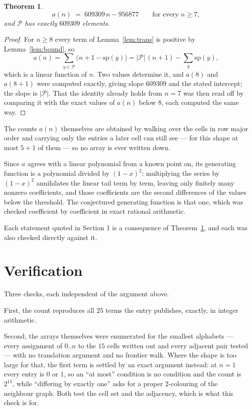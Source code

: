 \documentclass[11pt,a4paper]{article}
\theoremstyle{plain}
\newtheorem{theorem}{Theorem}
\theoremstyle{definition}
\begin{document}
\begin{theorem}\label{thm:line}
\[
a(n)\;=\;609309\,n-956877\qquad\text{for every }n\ge7,
\]
and $\mathcal P$ has exactly $609309$ elements.
\end{theorem}

\begin{proof}
For $n\ge8$ every term of Lemma~\ref{lem:trans} is positive by
Lemma~\ref{lem:bound}, so
\[
a(n)=\sum_{y\in\mathcal P}\bigl(n+1-\mathrm{sp}(y)\bigr)
=|\mathcal P|\,(n+1)-\sum_{y}\mathrm{sp}(y),
\]
which is a linear function of $n$. Two values determine it, and $a(8)$ and
$a(8+1)$ were computed exactly, giving slope $609309$ and the stated intercept; the slope
is $|\mathcal P|$. That the identity already holds from $n=7$ was then read off by
comparing it with the exact values of $a(n)$ below $8$, each computed the same way.
\end{proof}

The counts $a(n)$ themselves are obtained by walking over the cells in row major order and
carrying only the entries a later cell can still see --- for this shape at most $5+1$ of
them --- so no array is ever written down.

Since $a$ agrees with a linear polynomial from a known point on, its generating function is a
polynomial divided by $(1-x)^2$: multiplying the series by $(1-x)^2$ annihilates the linear
tail term by term, leaving only finitely many nonzero coefficients, and those coefficients are
the second differences of the values below the threshold. The conjectured generating function
is that one, which was checked coefficient by coefficient in exact rational arithmetic.

Each statement quoted in Section 1 is a consequence of Theorem~\ref{thm:line}, and each was
also checked directly against it.

\section{Verification}

Three checks, each independent of the argument above.

First, the count reproduces all $25$ terms the entry publishes, exactly, in integer
arithmetic.

Second, the arrays themselves were enumerated for the smallest alphabets --- every assignment
of $0..n$ to the $15$ cells written out and every adjacent pair tested --- with no
translation argument and no frontier walk. Where the shape is too large for that, the first
term is settled by an exact argument instead: at $n=1$ every entry is $0$ or $1$, so an ``at
most'' condition is no condition and the count is $2^{15}$, while ``differing by exactly
one'' asks for a proper $2$-colouring of the neighbour graph. Both test the cell set and the
adjacency, which is what this check is for.
\end{document}
